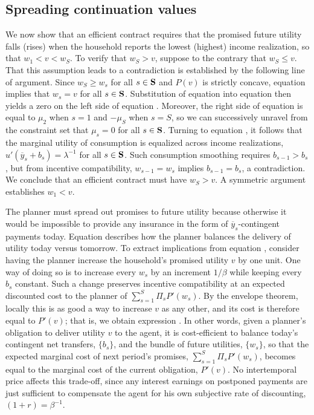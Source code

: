 \subsection{Spreading continuation values}

We now show that an efficient contract requires that the promised future utility
falls (rises) when the household reports the lowest (highest)
income realization, so that $w_1 < v < w_S$. To verify that
$w_S>v$, suppose to the contrary that $w_S \leq v$. That this assumption leads to a contradiction is established
by the following line of argument.  Since $w_S
\geq w_s$ for all $s \in {\bf S}$ and $P(v)$ is strictly concave,
equation  implies that $w_s = v$ for all $s \in
{\bf S}$. Substitution of equation  into equation
 then yields a zero on the left side of equation
. Moreover, the right side of equation
 is equal to $\mu_2$ when $s=1$ and $-\mu_S$ when
$s=S$, so we can successively unravel from the constraint set
 that $\mu_s=0$ for all $s \in {\bf S}$. Turning to
equation , it follows that the marginal utility of
consumption is equalized across income realizations, $u'(\overline
y_s+b_s)=\lambda^{-1}$ for all $s \in {\bf S}$. Such consumption
smoothing requires $b_{s-1}>b_s$, but from incentive
compatibility, $w_{s-1} = w_s$ implies $b_{s-1} = b_s$, a
contradiction. We conclude that an efficient contract must have
$w_S>v$. A symmetric argument establishes $w_1 < v$.

The planner must spread out promises
to future utility because otherwise it would  be impossible to
provide any insurance in the form of $\overline y_s$-contingent payments today.
Equation  describes how the planner balances the delivery of utility today versus tomorrow.
To extract implications from equation , consider having  the planner increase
the household's promised utility $v$ by one unit. One way of
doing so is to increase every $w_s$ by an increment $1/\beta$
while keeping every $b_s$ constant. Such a change preserves
incentive compatibility at an expected discounted cost to the
planner of $\sum_{s=1}^S \Pi_s P'(w_s)$.
 By the envelope
theorem, locally  this is as good a way to increase $v$ as any
other, and its cost is therefore equal to $P'(v)$; that is, we
obtain expression . In other words,
given a planner's obligation to deliver utility $v$ to the agent,
it is cost-efficient
to  balance  today's contingent net transfers,
$\{b_s\}$, and the bundle of future utilities, $\{w_s\}$, so
that the expected marginal cost of next period's promises,
$\sum_{s=1}^S \Pi_s P'(w_s)$, becomes equal to the marginal cost
of the current obligation, $P'(v)$. No intertemporal price
affects  this trade-off, since any interest earnings on
postponed payments are just sufficient to compensate the agent
for his own subjective rate of discounting, $(1+r)=\beta^{-1}$.

